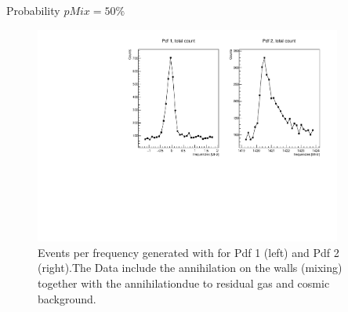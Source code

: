 \documentclass[9pt]{beamer}
\begin{document}
\begin{frame}{Probability $pMix = 50 \% $}
\begin{figure}[hbtp]
\centering
\includegraphics[width = 0.9\textwidth]{LineShapeTotal.pdf}
\caption{Events per frequency generated with for Pdf 1 (left) and Pdf 2 (right).\newline The Data include the annihilation on the walls (mixing) together with the annihilation\newline due to residual gas and cosmic background.}
\end{figure}

\end{frame}
\end{document}
